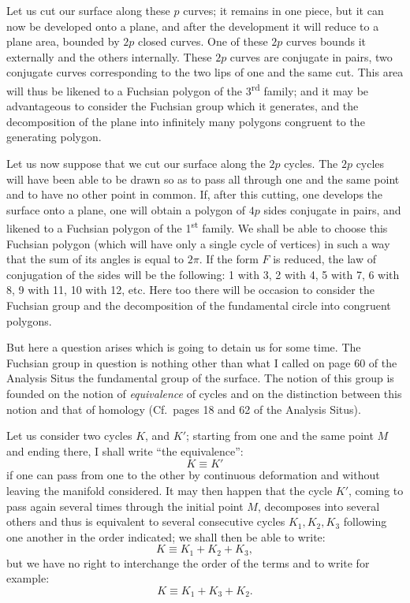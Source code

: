 \documentclass{article}
\begin{document}
Let us cut our surface along these $p$ curves; it remains in one piece, but it can now be developed onto a plane, and after the development it will reduce to a plane area, bounded by $2p$ closed curves. One of these $2p$ curves bounds it externally and the others internally. These $2p$ curves are conjugate in pairs, two conjugate curves corresponding to the two lips of one and the same cut. This area will thus be likened to a Fuchsian polygon of the 3\textsuperscript{rd} family; and it may be advantageous to consider the Fuchsian group which it generates, and the decomposition of the plane into infinitely many polygons congruent to the generating polygon.


Let us now suppose that we cut our surface along the $2p$ cycles. The $2p$ cycles will have been able to be drawn so as to pass all through one and the same point and to have no other point in common. If, after this cutting, one develops the surface onto a plane, one will obtain a polygon of $4p$ sides conjugate in pairs, and likened to a Fuchsian polygon of the 1\textsuperscript{st} family. We shall be able to choose this Fuchsian polygon (which will have only a single cycle of vertices) in such a way that the sum of its angles is equal to $2\pi$. If the form $F$ is reduced, the law of conjugation of the sides will be the following: 1 with 3, 2 with 4, 5 with 7, 6 with 8, 9 with 11, 10 with 12, etc. Here too there will be occasion to consider the Fuchsian group and the decomposition of the fundamental circle into congruent polygons.

But here a question arises which is going to detain us for some time. The Fuchsian group in question is nothing other than what I called on page 60 of the Analysis Situs the fundamental group of the surface. The notion of this group is founded on the notion of \emph{equivalence} of cycles and on the distinction between this notion and that of homology (Cf.\ pages 18 and 62 of the Analysis Situs).

Let us consider two cycles $K$, and $K'$; starting from one and the same point $M$ and ending there, I shall write ``the equivalence'':
\[ K \equiv K' \]
if one can pass from one to the other by continuous deformation and without leaving the manifold considered. It may then happen that the cycle $K'$, coming to pass again several times through the initial point $M$, decomposes into several others and thus is equivalent to several consecutive cycles $K_{1}, K_{2}, K_{3}$ following one another in the order indicated; we shall then be able to write:
\[ K \equiv K_{1} + K_{2} + K_{3}, \]
but we have no right to interchange the order of the terms and to write for example:
\[ K \equiv K_{1} + K_{3} + K_{2}. \]
\end{document}
